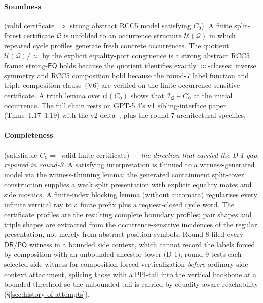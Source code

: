 \documentclass[
]{ceurart}
\theoremstyle{definition}
\newcommand{\DR}{\ensuremath{\mathsf{DR}}}
\newcommand{\PO}{\ensuremath{\mathsf{PO}}}
\newcommand{\EQ}{\ensuremath{\mathsf{EQ}}}
\newcommand{\PPI}{\ensuremath{\mathsf{PPI}}}
\newcommand{\cl}{\ensuremath{\mathsf{cl}}}
\newcommand{\Q}{\ensuremath{\mathcal Q}}
\newcommand{\U}{\ensuremath{\mathcal U}}
\newcommand{\eqc}{\ensuremath{\approx}}  %
\begin{document}
\paragraph{Soundness} (valid certificate $\Rightarrow$ strong
abstract RCC5 model satisfying $C_0$).  A finite split-forest
certificate $\Q$ is unfolded to an occurrence structure $\U(\Q)$
in which repeated cycle profiles generate fresh concrete
occurrences.  The quotient $\U(\Q)/\eqc$ by the explicit
equality-port congruence is a strong abstract RCC5 frame:
strong-$\EQ$ holds because the quotient identifies exactly
$\eqc$-classes; inverse symmetry and RCC5 composition hold because
the round-7 label function and triple-composition clause~(V6) are
verified on the finite occurrence-sensitive certificate.  A truth
lemma over $\cl(C_0)$ shows that $\mathcal{I}_\Q\models C_0$ at the
initial occurrence.  The full chain rests on GPT-5.4's v1
sibling-interface paper~\cite{SiblingCompleted}
(Thms~1.17--1.19) with the v2 delta~\cite{SiblingInterfaceV2},
plus the round-7 architectural specifics.

\paragraph{Completeness} (satisfiable $C_0\Rightarrow$ valid
finite certificate) --- \emph{the direction that carried the D-1
gap, repaired in round-9}.  A satisfying interpretation is thinned
to a witness-generated model via the witness-thinning lemma; the
generated containment split-cover construction supplies a weak
split presentation with explicit equality mates and side mosaics.
A finite-index blocking lemma (without automata) regularises every
infinite vertical ray to a finite prefix plus a request-closed
cycle word.  The certificate profiles are the resulting complete
boundary profiles; pair shapes and triple shapes are extracted
from the occurrence-sensitive incidences of the regular
presentation, not merely from abstract position symbols.  Round-8
filed every $\DR/\PO$ witness in a bounded side context, which
cannot record the labels forced by composition with an unbounded
ancestor tower (D-1); round-9 tests each selected side witness for
composition-forced verticalization \emph{before} ordinary
side-context attachment, splicing those with a $\PPI$-tail into the
vertical backbone at a bounded threshold so the unbounded tail is
carried by equality-aware reachability
(\S\ref{sec:history-of-attempts}).
\end{document}
